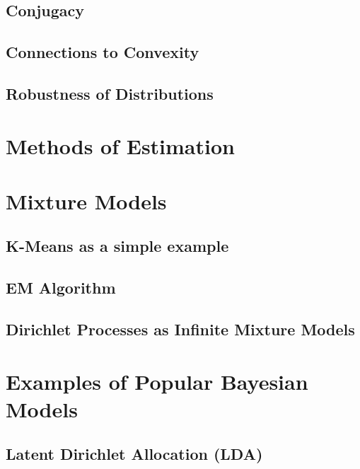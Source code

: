 \documentclass[a4paper]{article}
\begin{document}
\subsection{Conjugacy}

\subsection{Connections to Convexity}

\subsection{Robustness of Distributions}

\section{Methods of Estimation}

\section{Mixture Models}
\subsection{K-Means as a simple example}
\subsection{EM Algorithm}
\subsection{Dirichlet Processes as Infinite Mixture Models}

\section{Examples of Popular Bayesian Models}
\subsection{Latent Dirichlet Allocation (LDA)}
 


\end{document}
